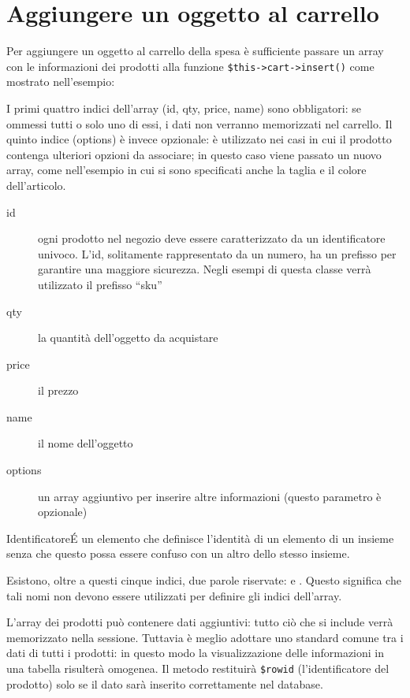 \section*{Aggiungere un oggetto al carrello}
Per aggiungere un oggetto al carrello della spesa è sufficiente passare un array con le informazioni dei prodotti alla funzione \verb|$this->cart->insert()| come mostrato nell'esempio:


I primi quattro indici dell'array (id, qty, price, name) sono obbligatori: se ommessi tutti o solo uno di essi, i dati non verranno memorizzati nel carrello. Il quinto indice (options) è invece opzionale: è utilizzato nei casi in cui il prodotto contenga ulteriori opzioni da associare; in questo caso viene passato un nuovo array, come nell'esempio in cui si sono specificati anche la taglia e il colore dell'articolo.

\begin{description}
\item[id] ogni prodotto nel negozio deve essere caratterizzato da un identificatore univoco. L'id, solitamente rappresentato da un numero, ha un prefisso per garantire una maggiore sicurezza. Negli esempi di questa classe verrà utilizzato il prefisso ``sku''
\item [qty] la quantità dell'oggetto da acquistare
\item [price] il prezzo
\item [name] il nome dell'oggetto
\item [options] un array aggiuntivo per inserire altre informazioni (questo parametro è opzionale)
\end{description}

\begin{deftab}{Identificatore}{\'E un elemento che definisce l'identità di un elemento di un insieme senza che questo possa essere confuso con un altro dello stesso insieme.}
\end{deftab}

Esistono, oltre a questi cinque indici, due parole riservate:  e . Questo significa che tali nomi non devono essere utilizzati per definire gli indici dell'array.

L'array dei prodotti può contenere dati aggiuntivi: tutto ciò che si include verrà memorizzato nella sessione. Tuttavia è meglio adottare uno standard comune tra i dati di tutti i prodotti: in questo modo la visualizzazione delle informazioni in una tabella risulterà omogenea. Il metodo  restituirà \verb|$rowid| (l'identificatore del prodotto) solo se il dato sarà inserito correttamente nel database.


